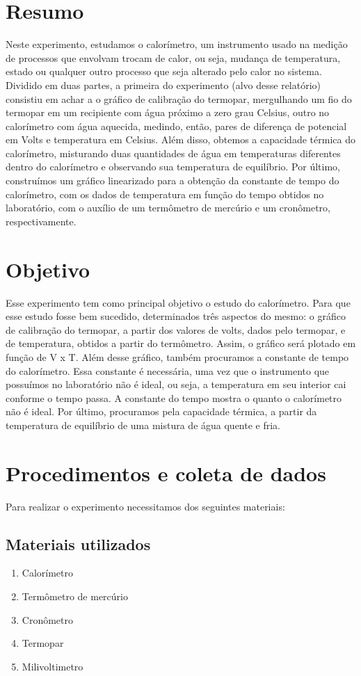 \documentclass[a4paper]{article}
\begin{document}
\section{Resumo}
	Neste experimento, estudamos o calorímetro, um instrumento usado na medição de processos que envolvam trocam de calor, ou seja, mudança de temperatura, estado ou qualquer outro processo que seja alterado pelo calor no sistema. Dividido em duas partes, a primeira do experimento (alvo desse relatório) consistiu em achar a o gráfico de calibração do termopar, mergulhando um fio do termopar em um recipiente com água próximo a zero grau Celsius, outro no calorímetro com água aquecida, medindo, então, pares de diferença de potencial em Volts e temperatura em Celsius. Além disso, obtemos a capacidade térmica do calorímetro, misturando duas quantidades de água em temperaturas diferentes dentro do calorímetro e observando sua temperatura de equilíbrio. Por último, construímos um gráfico linearizado para a obtenção da constante de tempo do calorímetro, com os dados de temperatura em função do tempo obtidos no laboratório, com o auxílio de um termômetro de mercúrio e um cronômetro, respectivamente.

\section{Objetivo}
	Esse experimento tem como principal objetivo o estudo do calorímetro. Para que esse estudo fosse bem sucedido, determinados três aspectos do mesmo: o gráfico de calibração do termopar, a partir dos valores de volts, dados pelo termopar, e de temperatura, obtidos a partir do termômetro. Assim, o gráfico será plotado em função de V x T. Além desse gráfico, também procuramos a constante de tempo do calorímetro. Essa constante é necessária, uma vez que o instrumento que possuímos no laboratório não é ideal, ou seja, a temperatura em seu interior cai conforme o tempo passa. A constante do tempo mostra o quanto o calorímetro não é ideal. Por último, procuramos pela capacidade térmica, a partir da temperatura de equilíbrio de uma mistura de água quente e fria.
	
\section{Procedimentos e coleta de dados}
	Para realizar o experimento necessitamos dos seguintes materiais:
	\subsection{Materiais utilizados}
		\begin{enumerate}
			\item Calorímetro
			\item Termômetro de mercúrio
			\item Cronômetro
			\item Termopar
			\item Milivoltimetro
		\end{enumerate}
\end{document}
